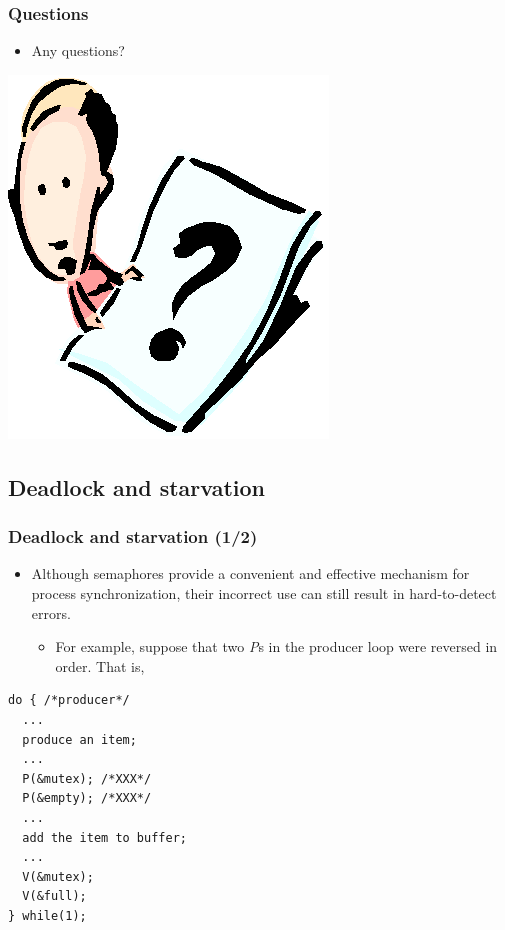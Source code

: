 \documentclass[CJKutf8,xcolor=pdftex,dvipsnames,table]{beamer}
\begin{document}
\begin{CJK*}{UTF8}{song}
  \begin{frame}
  \frametitle{Questions}
  \begin{itemize}
  \item{Any questions?}
  \end{itemize}
  \begin{center}
    \includegraphics[scale=.5]{question}
  \end{center}
  \end{frame}

\iffalse

\subsection{Deadlock and starvation}

  \begin{frame}[fragile]
  \frametitle{Deadlock and starvation (1/2)} \pause
  \begin{itemize}
  \item{Although semaphores provide a convenient and effective mechanism for process synchronization, their incorrect use can still result in hard-to-detect errors.} \pause
    \begin{itemize}
    \item{For example, suppose that two \emph{P}s in the producer loop were reversed in order. That is, } \pause
    \end{itemize}
  \end{itemize}
  \begin{minipage}[c]{0.5\textwidth}

\begin{lstlisting}
do { /*producer*/
  ...
  produce an item;
  ...
  P(&mutex); /*XXX*/
  P(&empty); /*XXX*/
  ...
  add the item to buffer;
  ...
  V(&mutex);
  V(&full);
} while(1);
\end{lstlisting}


\end{minipage}
\end{frame}
\end{CJK*}
\end{document}
